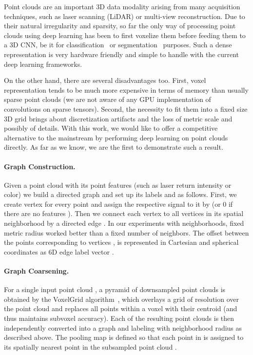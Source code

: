 \documentclass[10pt,twocolumn,letterpaper]{article}
\begin{document}
Point clouds are an important 3D data modality arising from many acquisition techniques, such as laser scanning (LiDAR) or multi-view reconstruction. Due to their natural irregularity and sparsity, so far the only way of processing point clouds using deep learning has been to first voxelize them before feeding them to a 3D CNN, be it for classification~\cite{voxnet} or segmentation~\cite{pclabeling16} purposes. Such a dense representation is very hardware friendly and simple to handle with the current deep learning frameworks.

On the other hand, there are several disadvantages too. First, voxel representation tends to be much more expensive in terms of memory than usually sparse point clouds (we are not aware of any GPU implementation of convolutions on sparse tensors). Second, the necessity to fit them into a fixed size 3D grid brings about discretization artifacts and the loss of metric scale and possibly of details. With this work, we would like to offer a competitive alternative to the mainstream by performing deep learning on point clouds directly. As far as we know, we are the first to demonstrate such a result.

\paragraph*{Graph Construction.} Given a point cloud  with its point features  (such as laser return intensity or color) we build a directed graph  and set up its labels  and  as follows. First, we create vertex  for every point  and assign the respective signal to it by  (or 0 if there are no features ). Then we connect each vertex  to all vertices  in its spatial neighborhood by a directed edge . In our experiments with neighborhoods, fixed metric radius  worked better than a fixed number of neighbors. The offset  between the points corresponding to vertices ,  is represented in Cartesian and spherical coordinates as 6D edge label vector .

\paragraph*{Graph Coarsening.} For a single input point cloud , a pyramid of downsampled point clouds  is obtained by the VoxelGrid algorithm~\cite{pclrusu}, which overlays a grid of resolution  over the point cloud and replaces all points within a voxel with their centroid (and thus maintains subvoxel accuracy). Each of the resulting point clouds  is then independently converted into a graph  and labeling  with neighborhood radius  as described above. The pooling map  is defined so that each point in  is assigned to its spatially nearest point in the subsampled point cloud .
\end{document}
